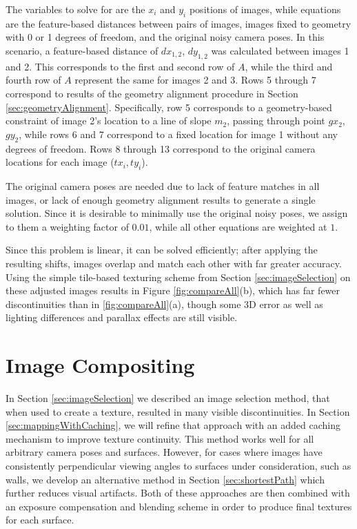 \documentclass[]{spie}  %
\begin{document}
The variables to solve for are the $x_i$ and $y_i$ positions
of images, while equations are the feature-based distances between
pairs of images, images fixed to geometry with 0 or 1 degrees of
freedom, and the original noisy camera poses. In this scenario, a
feature-based distance of $dx_{1,2}$, $dy_{1,2}$ was calculated
between images 1 and 2. This corresponds to the first and second row
of $A$, while the third and fourth row of $A$ represent the same for
images 2 and 3. Rows 5 through 7 correspond to results of the geometry
alignment procedure in Section
\ref{sec:geometryAlignment}. Specifically, row 5 corresponds to a
geometry-based constraint of image 2's location to a line of slope
$m_2$, passing through point $gx_2$, $gy_2$, while rows 6 and 7
correspond to a fixed location for image 1 without any degrees of
freedom. Rows 8 through 13 correspond to the original camera locations
for each image ($tx_i,ty_i$).

The original camera poses are needed due to lack of feature matches in
all images, or lack of enough geometry alignment results to generate a
single solution. Since it is desirable to minimally use the original
noisy poses, we assign to them a weighting factor of $0.01$, while all
other equations are weighted at $1$.

Since this problem is linear, it can be solved efficiently; after
applying the resulting shifts, images overlap and match each other
with far greater accuracy. Using the simple tile-based texturing
scheme from Section \ref{sec:imageSelection} on these adjusted images
results in Figure \ref{fig:compareAll}(b), which has far fewer
discontinuities than in \ref{fig:compareAll}(a), though some 3D error
as well as lighting differences and parallax effects are still
visible.

\section{Image Compositing}
\label{sec:imageCompositing}
In Section \ref{sec:imageSelection} we described an image selection
method, that when used to create a texture, resulted in many visible
discontinuities. In Section \ref{sec:mappingWithCaching}, we will
refine that approach with an added caching mechanism to improve
texture continuity. This method works well for all arbitrary camera
poses and surfaces. However, for cases where images have consistently
perpendicular viewing angles to surfaces under consideration, such as
walls, we develop an alternative method in Section
\ref{sec:shortestPath} which further reduces visual artifacts. Both of
these approaches are then combined with an exposure compensation and
blending scheme in order to produce final textures for each surface.
\end{document}

